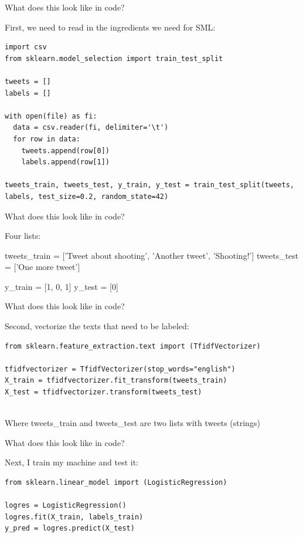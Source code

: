 \documentclass[compress]{beamer}
\begin{document}
\begin{frame}[fragile]{What does this look like in code?}
	
First, we need to read in the ingredients we need for SML: 
	
\begin{lstlisting}
import csv
from sklearn.model_selection import train_test_split

tweets = []
labels = []

with open(file) as fi:
  data = csv.reader(fi, delimiter='\t')
  for row in data:
    tweets.append(row[0])
    labels.append(row[1])

tweets_train, tweets_test, y_train, y_test = train_test_split(tweets, labels, test_size=0.2, random_state=42)
\end{lstlisting}
\end{frame}


\begin{frame}[fragile]{What does this look like in code?}
	
Four lists: 
	
\begin{lstlistingoutput}

tweets_train = ['Tweet about shooting', 'Another tweet', 'Shooting!']
tweets_test = ['One more tweet']

y_train = [1, 0, 1]	
y_test = [0]	

\end{lstlistingoutput}
\end{frame}



\begin{frame}[fragile]{What does this look like in code?}
	
Second, vectorize the texts that need to be labeled: 
	
\begin{lstlisting}
from sklearn.feature_extraction.text import (TfidfVectorizer)
		
tfidfvectorizer = TfidfVectorizer(stop_words="english")
X_train = tfidfvectorizer.fit_transform(tweets_train)
X_test = tfidfvectorizer.transform(tweets_test)
		
\end{lstlisting}
	
Where tweets\_train and tweets\_test are two lists with tweets (strings)
	
\end{frame}


\begin{frame}[fragile]{What does this look like in code?}
	
Next, I train my machine and test it: 
	
\begin{lstlisting}
from sklearn.linear_model import (LogisticRegression)
		
logres = LogisticRegression()
logres.fit(X_train, labels_train)
y_pred = logres.predict(X_test)
\end{lstlisting}
\end{frame}
\end{document}
